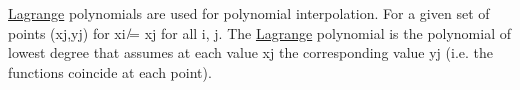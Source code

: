 \mbox{\hyperlink{class_lagrange}{Lagrange}} polynomials are used for polynomial interpolation. For a given set of points (xj,yj) for xi ̸= xj for all i, j. The \mbox{\hyperlink{class_lagrange}{Lagrange}} polynomial is the polynomial of lowest degree that assumes at each value xj the corresponding value yj (i.\+e. the functions coincide at each point). 